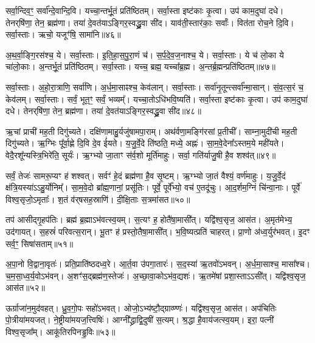    सर्वा॒न्दिव॒ꣳ॒ सर्वा᳚न्दे॒वान्दि॒वि।
   यच्चा॒न्तर्भू॒तं प्रति॑ष्ठितम्।
   सर्वा॒स्ता इष्ट॑काः कृ॒त्वा।
   उप॑ काम॒दुघा॑ दधे।
   तेनर्‌षि॑णा॒ तेन॒ ब्रह्म॑णा।
   तया॑ दे॒वत॑याऽङ्गिर॒स्वद्ध्रु॒वा सी॑द।
   याव॑ती॒स्तार॑काः॒ सर्वाः᳚।
   वित॑ता रोच॒ने दि॒वि।
   सर्वा॒स्ताः।
   ऋचो॒ यजूꣳ॑षि॒ सामा॑नि॥४६॥

   अ॒थ॒र्वा॒ङ्गि॒रस॑श्च॒ ये।
   सर्वा॒स्ताः।
   इ॒ति॒हा॒स॒पु॒रा॒णं च॑।
   स॒र्प॒दे॒व॒ज॒नाश्च॒ ये।
   सर्वा॒स्ताः।
   ये च॑ लो॒का ये चा॑लो॒काः।
   अ॒न्तर्भू॒तं प्रति॑ष्ठितम्।
   सर्वा॒स्ताः।
   यच्च॒ ब्रह्म॒ यच्चा᳚ब्र॒ह्म।
   अ॒न्तर्ब्र॒ह्मन्प्रति॑ष्ठितम्॥४७॥

   सर्वा॒स्ताः।
   अ॒हो॒रा॒त्राणि॒ सर्वा॑णि।
   अ॒र्ध॒मा॒साꣴश्च॒ केव॑लान्।
   सर्वा॒स्ताः।
   सर्वा॑नृ॒तून्त्सर्वा᳚न्मा॒सान्।
   सं॒व॒त्स॒रं च॒ केव॑लम्।
   सर्वा॒स्ताः।
   सर्वं॒ भूत॒ꣳ॒ सर्वं॒ भव्यम्᳚।
   यच्चा॒तोऽधि॑भवि॒ष्यति॑।
   सर्वा॒स्ता इष्ट॑काः कृ॒त्वा।
   उप॑ काम॒दुघा॑ दधे।
   तेनर्‌षि॑णा॒ तेन॒ ब्रह्म॑णा।
   तया॑ दे॒वत॑याऽङ्गिर॒स्वद्ध्रु॒वा सी॑द॥४८॥
\anuvakamend
  
   ऋ॒चां प्राची॑ मह॒ती दिगु॑च्यते।
   दक्षि॑णामाहु॒र्यजु॑षामपा॒राम्।
   अथ॑र्वणा॒मङ्गि॑रसां प्र॒तीची᳚।
   साम्ना॒मुदी॑ची मह॒ती दिगु॑च्यते।
   ऋ॒ग्भिः पू᳚र्वा॒ह्णे दि॒वि दे॒व ई॑यते।
   य॒जु॒र्वे॒दे ति॑ष्ठति॒ मध्ये॒ अह्नः॑।
   सा॒म॒वे॒देना᳚ऽस्तम॒ये मही॑यते।
   वेदै॒रशू᳚न्यस्त्रि॒भिरे॑ति॒ सूर्यः॑।
   ऋ॒ग्भ्यो जा॒ताꣳ स॑र्व॒शो मूर्ति॑माहुः।
   सर्वा॒ गति॑र्याजु॒षी है॒व शश्व॑त्॥४९॥

   सर्वं॒ तेजः॑ सामरू॒प्यꣳ ह॑ शश्वत्।
   सर्वꣳ॑ हे॒दं ब्रह्म॑णा है॒व सृ॒ष्टम्।
   ऋ॒ग्भ्यो जा॒तं वैश्यं॒ वर्ण॑माहुः।
   य॒जु॒र्वे॒दं क्ष॑त्रि॒यस्या॑ऽऽहु॒र्योनिम्᳚।
   सा॒म॒वे॒दो ब्रा᳚ह्म॒णानां॒ प्रसू॑तिः।
   पूर्वे॒ पूर्वे᳚भ्यो॒ वच॑ ए॒तदू॑चुः।
   आ॒द॒र्\mbox{}शम॒ग्निं चि॑न्वा॒नाः।
   पूर्वे॑ विश्व॒सृजो॒ऽमृताः᳚।
   श॒तं व॑र्‌षसह॒स्राणि॑।
   दी॒क्षि॒ताः स॒त्रमा॑सत॥५०॥

   तप॑ आसीद्गृ॒हप॑तिः।
   ब्रह्म॑ ब्र॒ह्माऽभ॑वत्स्व॒यम्।
   स॒त्यꣳ ह॒ होतै॑षा॒मासी᳚त्।
   यद्वि॑श्व॒सृज॒ आस॑त।
   अ॒मृत॑मेभ्य॒ उद॑गायत्।
   स॒हस्रं॑ परिवत्स॒रान्।
   भू॒तꣳ ह॑ प्रस्तो॒तैषा॒मासी᳚त्।
   भ॒वि॒ष्यत्प्रति॑ चाहरत्।
   प्रा॒णो अ॑ध्व॒र्युर॑भवत्।
   इ॒दꣳ सर्व॒ꣳ॒ सिषा॑सताम्॥५१॥

   अ॒पा॒नो वि॒द्वाना॒वृतः॑।
   प्रति॒प्राति॑ष्ठदध्व॒रे।
   आ॒र्त॒वा उ॑पगा॒तारः॑।
   स॒द॒स्या॑ ऋ॒तवो॑ऽभवन्।
   अ॒र्ध॒मा॒साश्च॒ मासा᳚श्च।
   च॒म॒सा॒ध्व॒र्य॒वोऽभ॑वन्।
   अ॒शꣳ॑स॒द्ब्रह्म॑ण॒स्तेजः॑।
   अ॒च्छा॒वा॒कोऽभ॑व॒द्यशः॑।
   ऋ॒तमे॑षां प्रशा॒स्ताऽऽसी᳚त्।
   यद्वि॑श्व॒सृज॒ आस॑त॥५२॥

   ऊर्ग्राजा॑न॒मुद॑वहत्।
   ध्रु॒व॒गो॒पः सहो॑ऽभवत्।
   ओजो॒ऽभ्य॑ष्टौ॒\-द्ग्राव्ण्णः॑।
   यद्वि॑श्व॒सृज॒ आस॑त।
   अप॑चितिः पो॒त्रीया॑मयजत्।
   ने॒ष्ट्रीया॑म\-यज॒त्त्विषिः॑।
   आग्नी᳚द्ध्राद्वि॒दुषी॑ स॒त्यम्।
   श्र॒द्धा है॒वाय॑जत्स्व॒यम्।
   इरा॒ पत्नी॑ विश्व॒सृजा᳚म्।
   आकू॑तिरपिन\-ड्ढ॒विः॥५३॥

